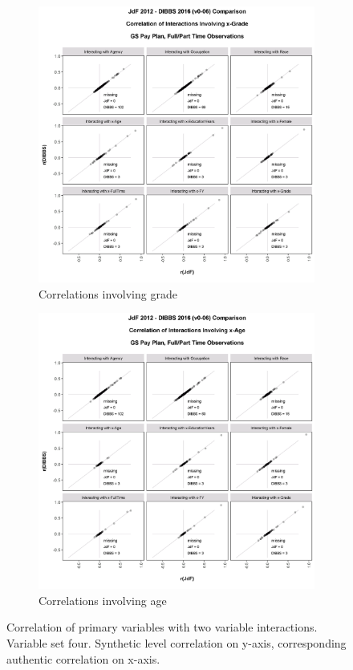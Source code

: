 \documentclass[10pt, letterpaper]{article}
\begin{document}
\begin{spacing}{1.0}
\clearpage

\begin{figure}[h]
    \centering
    \begin{subfigure}{1\textwidth}
        \centering
        \includegraphics[width=4.5in, trim={0 0.2in 0 1in}, clip]{JdFDIBBSCorrelationInteraction-x-Grade.png}
        \caption{Correlations involving grade}
        \vspace{12pt}
    \end{subfigure}
    \begin{subfigure}{1\textwidth}
        \centering
        \includegraphics[width=4.5in, trim={0 0.2in 0 1in}, clip]{JdFDIBBSCorrelationInteraction-x-Age.png}
        \caption{Correlations involving age}
        \vspace{12pt}
    \end{subfigure}
    \caption{Correlation of primary variables with two variable interactions.  Variable set four.  Synthetic level correlation on y-axis, corresponding authentic correlation on x-axis.}
    \label{figure:JdFDIBBSCorrelationInteraction4}
\end{figure}


\end{spacing}
\end{document}
